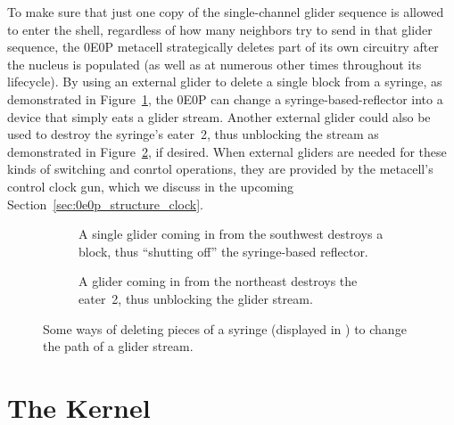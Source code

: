To make sure that just one copy of the single-channel glider sequence is allowed to enter the shell, regardless of how many neighbors try to send in that glider sequence, the 0E0P metacell strategically deletes part of its own circuitry after the nucleus is populated (as well as at numerous other times throughout its lifecycle). By using an external glider to delete a single block from a syringe, as demonstrated in Figure~\ref{fig:syringe_delete_block}, the 0E0P can change a syringe-based-reflector into a device that simply eats a glider stream. Another external glider could also be used to destroy the syringe's eater~2, thus unblocking the stream as demonstrated in Figure~\ref{fig:syringe_delete_eater}, if desired. When external gliders are needed for these kinds of switching and conrtol operations, they are provided by the metacell's control clock gun, which we discuss in the upcoming Section~\ref{sec:0e0p_structure_clock}.

\begin{figure}[!htb]
	\centering
	\begin{subfigure}{.535\textwidth}
		\centering
		\caption{A single glider coming in from the southwest destroys a block, thus ``shutting off'' the syringe-based reflector.}
		\label{fig:syringe_delete_block}
	\end{subfigure} \hfill \begin{subfigure}{.435\textwidth}
		\centering
		\caption{A glider coming in from the northeast destroys the eater~2, thus unblocking the glider stream.}
		\label{fig:syringe_delete_eater}
	\end{subfigure}
	\caption{Some ways of deleting pieces of a syringe (displayed in ) to change the path of a glider stream.}\label{fig:syringe_path_changer}
\end{figure}


\section{The Kernel}\label{sec:0e0p_structure_kernel}

